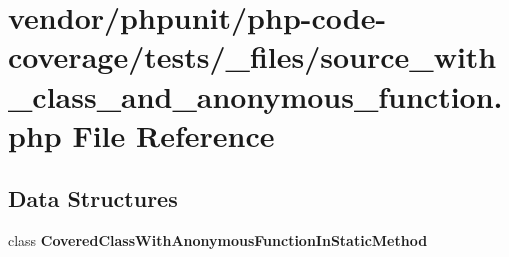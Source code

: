 \section{vendor/phpunit/php-\/code-\/coverage/tests/\+\_\+files/source\+\_\+with\+\_\+class\+\_\+and\+\_\+anonymous\+\_\+function.php File Reference}
\label{source__with__class__and__anonymous__function_8php}
\subsection*{Data Structures}
\begin{DoxyCompactItemize}
\item 
class {\bf Covered\+Class\+With\+Anonymous\+Function\+In\+Static\+Method}
\end{DoxyCompactItemize}
